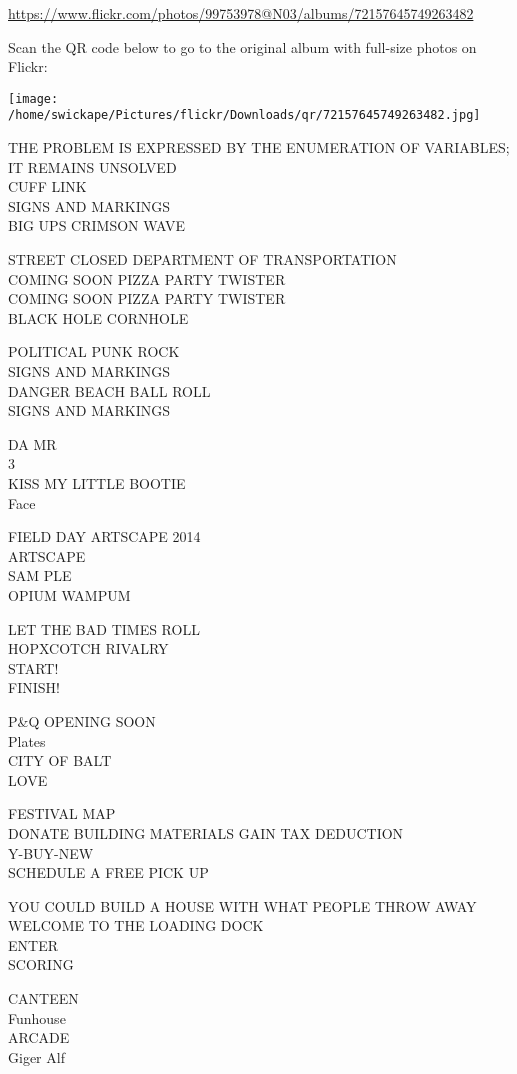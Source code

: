 \documentclass[10pt,letterpaper]{article}
\begin{document}
\url{https://www.flickr.com/photos/99753978@N03/albums/72157645749263482}

Scan the QR code below to go to the original album with full-size photos on Flickr:

\texttt{[image: /home/swickape/Pictures/flickr/Downloads/qr/72157645749263482.jpg]}


THE PROBLEM IS EXPRESSED BY THE ENUMERATION OF VARIABLES; IT REMAINS UNSOLVED\\
CUFF LINK\\
SIGNS AND MARKINGS\\
BIG UPS CRIMSON WAVE

STREET CLOSED DEPARTMENT OF TRANSPORTATION\\
COMING SOON PIZZA PARTY TWISTER\\
COMING SOON PIZZA PARTY TWISTER\\
BLACK HOLE CORNHOLE

POLITICAL PUNK ROCK\\
SIGNS AND MARKINGS\\
DANGER BEACH BALL ROLL\\
SIGNS AND MARKINGS

DA MR\\
3\\
KISS MY LITTLE BOOTIE\\
Face

FIELD DAY ARTSCAPE 2014\\
ARTSCAPE\\
SAM PLE\\
OPIUM WAMPUM

LET THE BAD TIMES ROLL\\
HOPXCOTCH RIVALRY\\
START!\\
FINISH!

P\&Q OPENING SOON\\
Plates\\
CITY OF BALT\\
LOVE

FESTIVAL MAP\\
DONATE BUILDING MATERIALS GAIN TAX DEDUCTION\\
Y{-}BUY{-}NEW\\
SCHEDULE A FREE PICK UP

YOU COULD BUILD A HOUSE WITH WHAT PEOPLE THROW AWAY\\
WELCOME TO THE LOADING DOCK\\
ENTER\\
SCORING

CANTEEN\\
Funhouse\\
ARCADE\\
Giger Alf
\end{document}

